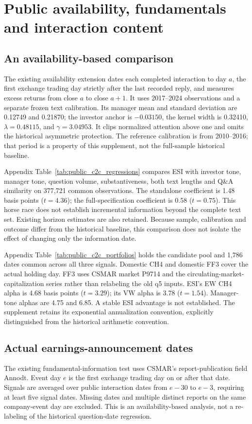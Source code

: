 \section{Public availability, fundamentals and interaction content}\label{sec:supplements}
\subsection{An availability-based comparison}
The existing availability extension dates each completed interaction to day $a$, the first exchange trading day strictly after the last recorded reply, and measures excess returns from close $a$ to close $a+1$. It uses 2017--2024 observations and a separate frozen text calibration. Its manager mean and standard deviation are 0.12749 and 0.21870; the investor anchor is $-0.03150$, the kernel width is 0.32410, $\lambda=0.48115$, and $\gamma=3.04953$. It clips normalized attention above one and omits the historical asymmetric protection. The reference calibration is from 2010--2016; that period is a property of this supplement, not the full-sample historical baseline.

Appendix Table~\ref{tab:public_c2c_regressions} compares ESI with investor tone, manager tone, question volume, substantiveness, both text lengths and Q\&A similarity on 377,721 common observations. The standalone coefficient is 1.48 basis points ($t=4.36$); the full-specification coefficient is 0.58 ($t=0.75$). This horse race does not establish incremental information beyond the complete text set. Existing horizon estimates are also retained. Because sample, calibration and outcome differ from the historical baseline, this comparison does not isolate the effect of changing only the information date.

Appendix Table~\ref{tab:public_c2c_portfolios} holds the candidate pool and 1,786 dates common across all three signals. Domestic CH4 and domestic FF3 cover the actual holding day. FF3 uses CSMAR market P9714 and the circulating-market-capitalization series rather than relabeling the old q5 inputs. ESI's EW CH4 alpha is 4.68 basis points ($t=3.29$); its VW alpha is 3.78 ($t=1.54$). Manager-tone alphas are 4.75 and 6.85. A stable ESI advantage is not established. The supplement retains its exponential annualization convention, explicitly distinguished from the historical arithmetic convention.

\subsection{Actual earnings-announcement dates}\label{sec:fundamental_channel}
The existing fundamental-information test uses CSMAR's report-publication field Annodt. Event day $e$ is the first exchange trading day on or after that date. Signals are averaged over public interaction dates from $e-30$ to $e-3$, requiring at least five signal dates. Missing dates and multiple distinct reports on the same company-event day are excluded. This is an availability-based analysis, not a re-labeling of the historical question-date regression.

